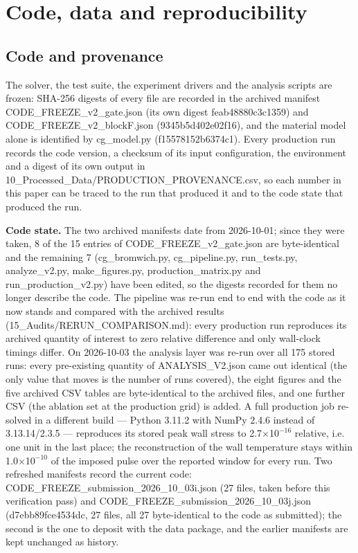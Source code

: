 \documentclass[preprint,12pt]{elsarticle}
\begin{document}
\section{Code, data and reproducibility}
\label{sec:9}

\subsection{Code and provenance}
\label{sec:9.1}

The solver, the test suite, the experiment drivers and the analysis scripts are frozen: SHA-256 digests of every file are recorded in the archived manifest CODE\_FREEZE\_v2\_gate.json (its own digest feab48880c3c1359) and CODE\_FREEZE\_v2\_blockF.json (9345b5d402e02f16), and the material model alone is identified by cg\_model.py (f15578152b6374c1). Every production run records the code version, a checksum of its input configuration, the environment and a digest of its own output in 10\_Processed\_Data/PRODUCTION\_PROVENANCE.csv, so each number in this paper can be traced to the run that produced it and to the code state that produced the run.

\textbf{Code state.} The two archived manifests date from 2026-10-01; since they were taken, 8 of the 15 entries of CODE\_FREEZE\_v2\_gate.json are byte-identical and the remaining 7 (cg\_bromwich.py, cg\_pipeline.py, run\_tests.py, analyze\_v2.py, make\_figures.py, production\_matrix.py and run\_production\_v2.py) have been edited, so the digests recorded for them no longer describe the code. The pipeline was re-run end to end with the code as it now stands and compared with the archived results (15\_Audits/RERUN\_COMPARISON.md): every production run reproduces its archived quantity of interest to zero relative difference and only wall-clock timings differ. On 2026-10-03 the analysis layer was re-run over all 175 stored runs: every pre-existing quantity of ANALYSIS\_V2.json came out identical (the only value that moves is the number of runs covered), the eight figures and the five archived CSV tables are byte-identical to the archived files, and one further CSV (the ablation set at the production grid) is added. A full production job re-solved in a different build --- Python 3.11.2 with NumPy 2.4.6 instead of 3.13.14/2.3.5 --- reproduces its stored peak wall stress to 2.7$\times$1$0^{-16}$ relative, i.e. one unit in the last place; the reconstruction of the wall temperature stays within 1.0$\times$1$0^{-10}$ of the imposed pulse over the reported window for every run. Two refreshed manifests record the current code: CODE\_FREEZE\_submission\_2026\_10\_03i.json (27 files, taken before this verification pass) and CODE\_FREEZE\_submission\_2026\_10\_03j.json (d7ebb89fce4534dc, 27 files, all 27 byte-identical to the code as submitted); the second is the one to deposit with the data package, and the earlier manifests are kept unchanged as history.
\end{document}
